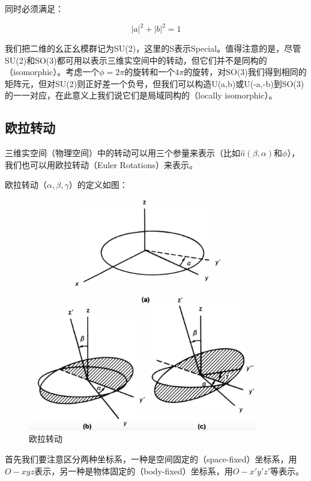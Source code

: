 同时必须满足：

\begin{equation}
|a|^2 + |b|^2 = 1
\end{equation}

我们把二维的幺正幺模群记为SU(2)，这里的S表示Special。值得注意的是，尽管SU(2)和SO(3)都可用以表示三维实空间中的转动，但它们并不是同构的（isomorphic）。考虑一个$\phi = 2 \pi$的旋转和一个$4 \pi$的旋转，对SO(3)我们得到相同的矩阵元，但对SU(2)则正好差一个负号，但我们可以构造U(a,b)或U(-a,-b)到SO(3)的一一对应，在此意义上我们说它们是局域同构的（locally isomorphic）。

\subsection{欧拉转动}

三维实空间（物理空间）中的转动可以用三个参量来表示（比如$\hat n (\beta, \alpha)$和$\phi$），我们也可以用欧拉转动（Euler Rotations）来表示。

欧拉转动（$\alpha, \beta, \gamma$）的定义如图：

\begin{figure}[htbp]
\begin{center}
\includegraphics[width=10cm]{AngularMomentum/eulerrotations.png}
\caption{欧拉转动}
\end{center}
\end{figure}

首先我们要注意区分两种坐标系，一种是空间固定的（space-fixed）坐标系，用$O-xyz$表示，另一种是物体固定的（body-fixed）坐标系，用$O-x' y' z'$等表示。

